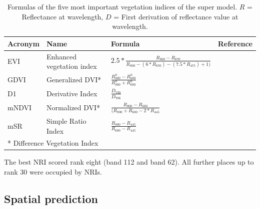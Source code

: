 \documentclass[review]{elsarticle}
\begin{document}
\begin{table}[t!]
\centering
\caption[t]{Formulas of the five most important vegetation indices of the super model. $R$ = Reflectance at wavelength, $D$ = First derivation of reflectance value at wavelength.}
\begingroup\footnotesize
\begin{tabular}{llll}
	\\
	Acronym & Name                      & Formula                                                            & Reference                                                 \\
	\hline
	EVI     & Enhanced vegetation index & $2.5*\frac{R_{800}-R_{670}}{R_{800}-(6*R_{670})-(7.5*R_{475})+1)}$ & \cite{hueteComparisonVegetationIndices1997}               \\
	GDVI    & Generalized DVI*          & $\frac{R_{800}^n-R_{680}^n}{R_{800}^n+R_{680}^n}$                  & \cite{wuEstimatingChlorophyllContent2008}                 \\
	D1      & Derivative Index          & $\frac{D_{730}}{D_{706}}$                                          & \cite{zarco-tejadaSteadystateChlorophyllFluorescence2003} \\
	mNDVI   & Normalized DVI*           & $  \frac{R_{800}-R_{680}}{(R_{800}+R_{680}-2*R_{445}}$             & \cite{simsRelationshipsLeafPigment2002}                   \\
	mSR     & Simple Ratio Index        & $\frac{R_{800}-R_{445}}{R_{680}-R_{445}}$                          & \cite{simsRelationshipsLeafPigment2002}                   \\
	\bottomrule
	\multicolumn{2}{l}{\small{* Difference Vegetation Index}}
\end{tabular}
\endgroup
\label{tab:most_imp_vars}
\end{table}

\noindent The best NRI scored rank eight (band 112 and band 62).
All further places up to rank 30 were occupied by NRIs.

\subsection{Spatial prediction}
\end{document}
